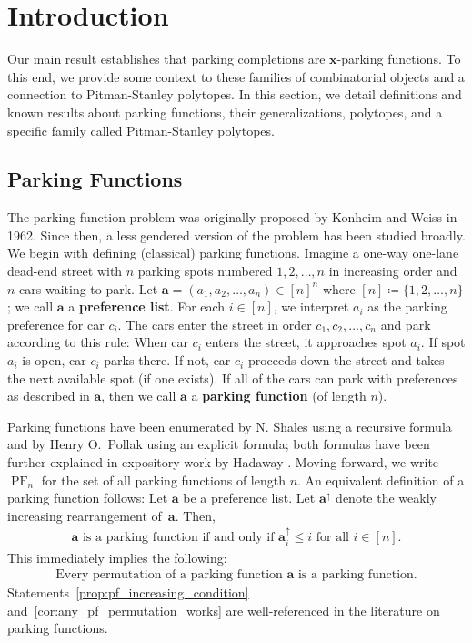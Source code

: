 \documentclass{amsart}
\theoremstyle{definition}
\numberwithin{equation}{section}
\newcommand{\PF}{\operatorname{PF}} %
\begin{document}
\section{Introduction}

Our main result establishes that parking completions are $\mathbf{x}$-parking functions. 
To this end, we provide some context to these families of combinatorial objects and a connection to Pitman-Stanley polytopes.
In this section, we detail definitions and known results about parking functions, their generalizations, polytopes, and a specific family called Pitman-Stanley polytopes.

\subsection{Parking Functions}\label{sec:pf_background_short_paper}
The parking function problem was originally proposed by Konheim and Weiss \cite{bib:KW} in 1962. 
Since then, a less gendered version of the problem has been studied broadly.
We begin with defining (classical) parking functions.
Imagine a one-way one-lane dead-end street with $n$ parking spots numbered $1, 2, \hdots, n$ in increasing order and $n$ cars waiting to park.
Let $\mathbf{a} = (a_1, a_2, \hdots, a_n) \in [n]^{n}$ where $[n] \coloneqq \{1, 2, \hdots, n\}$; we call $\mathbf{a}$ a \textbf{preference list}.
For each $i\in [n]$, we interpret $a_i$ as the parking preference for car $c_i$.
The cars enter the street in order $c_1, c_2, \hdots, c_n$ and park according to this rule: 
When car $c_i$ enters the street, it approaches spot $a_i$.
If spot $a_i$ is open, car $c_i$ parks there.
If not, car $c_i$ proceeds down the street and takes the next available spot (if one exists).
If all of the cars can park with preferences as described in $\mathbf{a}$, then we call $\mathbf{a}$ a \textbf{parking function} (of length $n$).

Parking functions have been enumerated by N. Shales \cite{bib:recursionproof} using a recursive formula and by Henry O.\ Pollak \cite{bib:stanleydocpollakproof} using an explicit formula; both formulas have been further explained in expository work by Hadaway \cite{bib:GirlsAnglePart1,bib:GirlsAnglePart2}.
Moving forward, we write $\PF_n$ for the set of all parking functions of length $n$.
An equivalent definition of a parking function follows:
    Let $\mathbf{a}$ be a preference list.
    Let $\mathbf{a}^\uparrow$ denote the weakly increasing rearrangement of~$\mathbf{a}$. Then,
    \begin{align}
    \mbox{$\mathbf{a}$ is a parking function if and only if $\mathbf{a}_i^\uparrow \leq i$ for all $i\in[n]$.}\label{prop:pf_increasing_condition}
    \end{align}
This immediately implies 
the following: 
\begin{align}\label{cor:any_pf_permutation_works}
    \mbox{Every permutation of a parking function $\mathbf{a}$ is a parking function.}
\end{align}
Statements~\eqref{prop:pf_increasing_condition} and~\eqref{cor:any_pf_permutation_works} are well-referenced in the literature on parking functions.
\end{document}
